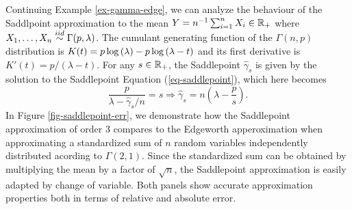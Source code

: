 \begin{example} \label{ex-gamma-saddle}
    Continuing Example \ref{ex-gamma-edge}, we can analyze the behaviour of the Saddlpoint approximation to the mean $Y = n^{-1}\sum_{i=1}^n X_i \in \mathbb{R}_+$ where $X_1, \ldots, X_n \stackrel{iid}{\sim} \Gamma(p, \lambda)$. The cumulant generating function of the $\Gamma(n, p)$ distribution is $K(t) = p\log\left(\lambda\right) - p\log\left(\lambda - t\right)$ and its first derivative is $K'(t) = p / (\lambda - t)$. For any $s \in \mathbb{R}_+$, the Saddlepoint $\hat\gamma_s$ is given by the solution to the Saddlepoint Equation (\ref{eq-saddlepoint}), which here becomes
    \begin{equation*}
        \frac{p}{\lambda - \hat\gamma_s/n} = s \Rightarrow \hat\gamma_s = n\left(\lambda - \frac{p}{s}\right).
    \end{equation*}
    In Figure \ref{fig-saddlepoint-err}, we demonstrate how the Saddlepoint approximation of order 3 compares to the Edgeworth apperoximation when approximating a standardized sum of $n$ random variables independently distributed acording to $\Gamma(2, 1)$. Since the standardized sum can be obtained by multiplying the mean by a factor of $\sqrt{n}$, the Saddlepoint approximation is easily adapted by change of variable. Both panels show accurate approximation properties both in terms of relative and absolute error.
    

\end{example}
